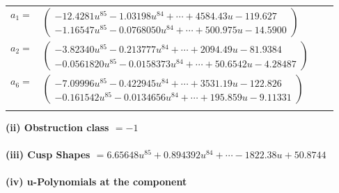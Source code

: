 \documentclass[1p]{elsarticle_modified}
\theoremstyle{definition}
\begin{document}
\begin{tabular}{m{7pt} m{180pt} m{7pt} m{180pt} }
\flushright $a_{1}=$&$\begin{pmatrix}-12.4281 u^{85}-1.03198 u^{84}+\cdots+4584.43 u-119.627\\-1.16547 u^{85}-0.0768050 u^{84}+\cdots+500.975 u-14.5900\end{pmatrix}$ \\
\flushright $a_{2}=$&$\begin{pmatrix}-3.82340 u^{85}-0.213777 u^{84}+\cdots+2094.49 u-81.9384\\-0.0561820 u^{85}-0.0158373 u^{84}+\cdots+50.6542 u-4.28487\end{pmatrix}$ \\
\flushright $a_{6}=$&$\begin{pmatrix}-7.09996 u^{85}-0.422945 u^{84}+\cdots+3531.19 u-122.826\\-0.161542 u^{85}-0.0134656 u^{84}+\cdots+195.859 u-9.11331\end{pmatrix}$\\&\end{tabular}
\flushleft \textbf{(ii) Obstruction class $= -1$}\\~\\
\flushleft \textbf{(iii) Cusp Shapes $= 6.65648 u^{85}+0.894392 u^{84}+\cdots-1822.38 u+50.8744$}\\~\\
\newpage\renewcommand{\arraystretch}{1}
\flushleft \textbf{(iv) u-Polynomials at the component}\newline \\
\end{document}
